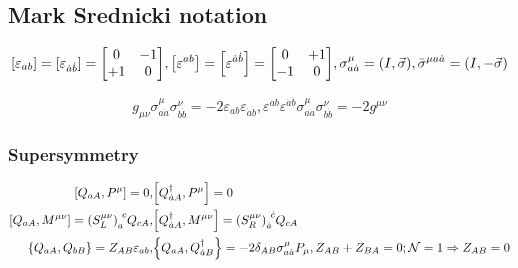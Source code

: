 \documentclass{article}
\begin{document}
\subsection{Mark Srednicki notation}

\[ \qty[\varepsilon_{ab}] = \qty[\varepsilon_{\dot{a} \dot{b}}] = \mqty[0 & -1 \\ +1 & 0], \qty[\varepsilon^{ab}] = \qty[\varepsilon^{\dot{a} \dot{b}}] = \mqty[0 & +1 \\ -1 & 0], \sigma^{\mu}_{a \dot{a}} = (I, \vec{\sigma}), \bar{\sigma}^{\mu a \dot{a}} = (I, - \vec{\sigma}) \]

\[ g_{\mu\nu} \sigma^{\mu}_{a \dot{a}} \sigma^{\nu}_{b \dot{b}} = - 2 \varepsilon_{ab} \varepsilon_{\dot{a} \dot{b}}, \varepsilon^{ab} \varepsilon^{\dot{a} \dot{b}} \sigma^{\mu}_{a \dot{a}} \sigma^{\nu}_{b \dot{b}} = - 2 g^{\mu \nu} \]

\subsubsection{Supersymmetry}

\begin{align*}
    \qty[Q_{aA}, P^{\mu}] = 0, & \qty[Q_{\dot{a}A}^{\dagger}, P^{\mu}] = 0 \\
    \qty[Q_{aA}, M^{\mu\nu}] = \qty(S_{L}^{\mu\nu})_{a}^{\ c} Q_{cA}, & \qty[Q_{\dot{a}A}^{\dagger}, M^{\mu\nu}] = \qty(S_{R}^{\mu\nu})_{\dot{a}}^{\ \dot{c}} Q_{cA} \\
    \qty{Q_{aA}, Q_{bB}} = Z_{AB} \varepsilon_{ab}, & \qty{Q_{aA}, Q_{\dot{a}B}^{\dagger}} = - 2 \delta_{AB} \sigma_{a\dot{a}}^{\mu} P_{\mu}, Z_{AB} + Z_{BA} = 0; \mathcal{N} = 1 \Rightarrow Z_{AB} = 0
\end{align*}
\end{document}
